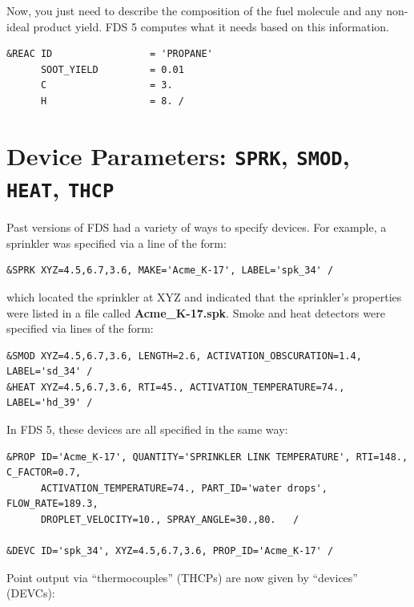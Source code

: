 \documentclass[11pt]{book}
\begin{document}
\noindent
Now, you just need to describe the composition of the fuel molecule and any non-ideal product yield. FDS 5 computes what it needs based on
this information.

\footnotesize
\begin{verbatim}
&REAC ID                 = 'PROPANE'
      SOOT_YIELD         = 0.01
      C                  = 3.
      H                  = 8. /
\end{verbatim}
\normalsize


\section{Device Parameters: \texorpdfstring{{\tt SPRK}}{SPRK}, \texorpdfstring{{\tt SMOD}}{SMOD},
\texorpdfstring{{\tt HEAT}}{HEAT}, \texorpdfstring{{\tt THCP}}{THCP}}

Past versions of FDS had a variety of ways to specify devices. For example, a sprinkler was specified via a line of the form:

\footnotesize
\begin{verbatim}
&SPRK XYZ=4.5,6.7,3.6, MAKE='Acme_K-17', LABEL='spk_34' /
\end{verbatim} \normalsize

\noindent
which located the sprinkler at {\ct XYZ} and indicated that the sprinkler's properties were listed in a file called {\bf Acme\_K-17.spk}.
Smoke and heat detectors were specified via lines of the form:

\footnotesize
\begin{verbatim}
&SMOD XYZ=4.5,6.7,3.6, LENGTH=2.6, ACTIVATION_OBSCURATION=1.4, LABEL='sd_34' /
&HEAT XYZ=4.5,6.7,3.6, RTI=45., ACTIVATION_TEMPERATURE=74., LABEL='hd_39' /
\end{verbatim} \normalsize

\noindent
In FDS 5, these devices are all specified in the same way:

\footnotesize
\begin{verbatim}
&PROP ID='Acme_K-17', QUANTITY='SPRINKLER LINK TEMPERATURE', RTI=148., C_FACTOR=0.7,
      ACTIVATION_TEMPERATURE=74., PART_ID='water drops', FLOW_RATE=189.3,
      DROPLET_VELOCITY=10., SPRAY_ANGLE=30.,80.   /

&DEVC ID='spk_34', XYZ=4.5,6.7,3.6, PROP_ID='Acme_K-17' /
\end{verbatim} \normalsize

\noindent
Point output via ``thermocouples'' ({\ct THCP}s) are now given by ``devices'' ({\ct DEVC}s):
\end{document}
